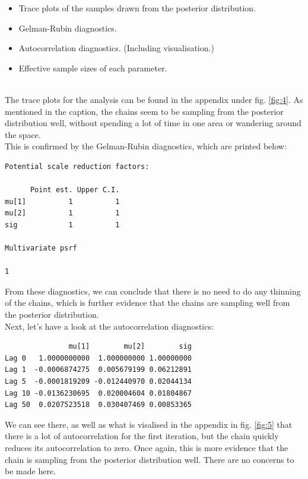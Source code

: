 \documentclass[journal, a4paper]{IEEEtran}
\begin{document}
\begin{itemize}
	\item Trace plots of the samples drawn from the posterior distribution.
	\item Gelman-Rubin diagnostics.
	\item Autocorrelation diagnostics. (Including visualisation.)
	\item Effective sample sizes of each parameter.
\end{itemize}

\ \\

The trace plots for the analysis can be found in the appendix under fig. \ref{fig:4}. As mentioned in the caption, the chains seem to be sampling from the 
posterior distribution well, without spending a lot of time in one area or wandering around the space.\\

This is confirmed by the Gelman-Rubin diagnostics, which are printed below:\\

\begin{verbatim}
Potential scale reduction factors:

      Point est. Upper C.I.
mu[1]          1          1
mu[2]          1          1
sig            1          1

Multivariate psrf

1
\end{verbatim}

From these diagnostics, we can conclude that there is no need to do any thinning of the chains, which is further evidence that the chains are sampling well from
the posterior distribution.\\

Next, let's have a look at the autocorrelation diagnostics:\\

\begin{verbatim}
               mu[1]        mu[2]        sig
Lag 0   1.0000000000  1.000000000 1.00000000
Lag 1  -0.0006874275  0.005679199 0.06212891
Lag 5  -0.0001819209 -0.012440970 0.02044134
Lag 10 -0.0136230695  0.020004604 0.01804867
Lag 50  0.0207523518  0.030407469 0.00853365
\end{verbatim}

We can see there, as well as what is visalised in the appendix in fig. \ref{fig:5} that there is a lot of autocorrelation for the first iteration, but the chain
quickly reduces its autocorrelation to zero. Once again, this is more evidence that the chain is sampling from the posterior distribution well. There are no
concerns to be made here.\\
\end{document}
